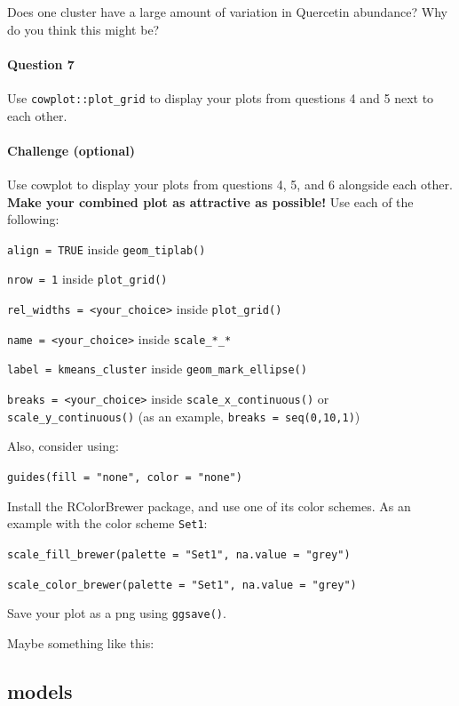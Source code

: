 \documentclass[
]{krantz}
\begin{document}
Does one cluster have a large amount of variation in Quercetin abundance? Why do you think this might be?

\hypertarget{question-7}{%
\paragraph{Question 7}\label{question-7}}

Use \texttt{cowplot::plot\_grid} to display your plots from questions 4 and 5 next to each other.

\hypertarget{challenge-optional}{%
\paragraph{Challenge (optional)}\label{challenge-optional}}

Use cowplot to display your plots from questions 4, 5, and 6 alongside each other. \textbf{Make your combined plot as attractive as possible!} Use each of the following:

\texttt{align\ =\ TRUE} inside \texttt{geom\_tiplab()}

\texttt{nrow\ =\ 1} inside \texttt{plot\_grid()}

\texttt{rel\_widths\ =\ \textless{}your\_choice\textgreater{}} inside \texttt{plot\_grid()}

\texttt{name\ =\ \textless{}your\_choice\textgreater{}} inside \texttt{scale\_*\_*}

\texttt{label\ =\ kmeans\_cluster} inside \texttt{geom\_mark\_ellipse()}

\texttt{breaks\ =\ \textless{}your\_choice\textgreater{}} inside \texttt{scale\_x\_continuous()} or \texttt{scale\_y\_continuous()} (as an example, \texttt{breaks\ =\ seq(0,10,1)})

Also, consider using:

\texttt{guides(fill\ =\ "none",\ color\ =\ "none")}

Install the RColorBrewer package, and use one of its color schemes. As an example with the color scheme \texttt{Set1}:

\texttt{scale\_fill\_brewer(palette\ =\ "Set1",\ na.value\ =\ "grey")}

\texttt{scale\_color\_brewer(palette\ =\ "Set1",\ na.value\ =\ "grey")}

Save your plot as a png using \texttt{ggsave()}.

Maybe something like this:

\hypertarget{models}{%
\subsection{models}\label{models}}
\end{document}
